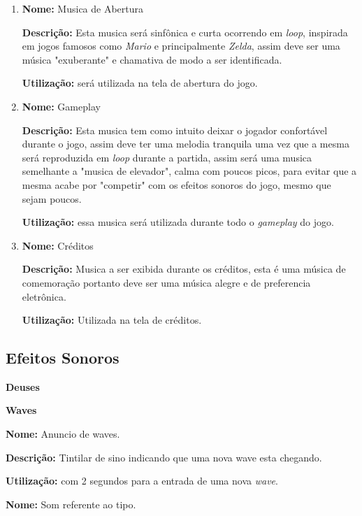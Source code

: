 \documentclass[11pt]{article} %
\begin{document}
\begin{enumerate}
\item 
\textbf{Nome:} Musica de Abertura

\textbf{Descrição:} Esta musica será sinfônica e curta ocorrendo em \textit{loop}, inspirada em jogos famosos como \textit{Mario} e principalmente \textit{Zelda}, assim deve ser uma música "exuberante" e chamativa de modo a ser identificada.

\textbf{Utilização:} será utilizada na tela de abertura do jogo.

\item
\textbf{Nome:} Gameplay

\textbf{Descrição:} Esta musica tem como intuito deixar o jogador confortável durante o jogo, assim deve ter uma melodia tranquila uma vez que a mesma será reproduzida em \textit{loop} durante a partida, assim será uma musica semelhante a "musica de elevador", calma com poucos picos, para evitar que a mesma acabe por "competir" com os efeitos sonoros do jogo, mesmo que sejam poucos.  

\textbf{Utilização:} essa musica será utilizada durante todo o \textit{gameplay} do jogo.

\item
\textbf{Nome:} Créditos

\textbf{Descrição:} Musica a ser exibida durante os créditos, esta é uma música de comemoração portanto deve ser uma música alegre e de preferencia eletrônica. 

\textbf{Utilização:} Utilizada na tela de créditos.
\end{enumerate}

\subsection{Efeitos Sonoros}
{\LARGE \textbf{Deuses}}

\begin{LARGE}
\textbf{Waves}

\end{LARGE}
\item
\textbf{Nome:} Anuncio de waves.

\textbf{Descrição:} Tintilar de sino indicando que uma nova wave esta chegando. 

\textbf{Utilização:} com 2 segundos para a entrada de uma nova \textit{wave}.

\item
\textbf{Nome:} Som referente ao tipo.
\end{document}

